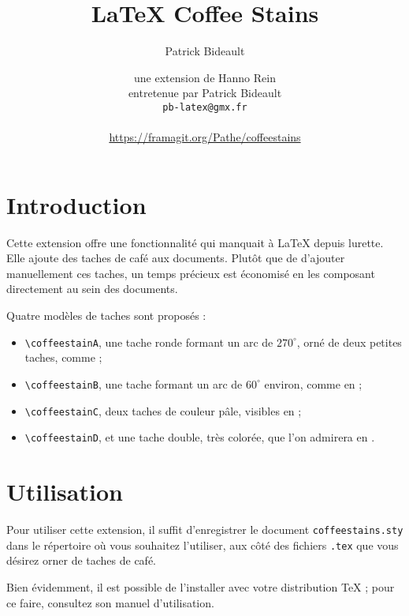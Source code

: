 \documentclass[a4paper, 11pt, BCOR = 0 pt, DIV = 13, oneside]{scrartcl}
\author{Patrick Bideault}
\begin{document}
\title{LaTeX Coffee Stains}
\author{une extension de Hanno Rein\\
  entretenue par Patrick Bideault\\
  \texttt{pb-latex@gmx.fr}\\
  ~\\
  \url{https://framagit.org/Pathe/coffeestains}}
\renewcommand{\today}{version \gitRel{} -- \DTMtoday{}}
\maketitle

\label{stainA}
\section{Introduction}
Cette extension offre une fonctionnalité qui manquait à \LaTeX{} depuis
lurette. Elle ajoute des taches de café aux documents. Plutôt que de
d'ajouter manuellement ces taches, un temps précieux est
économisé en les composant directement au sein des documents.

Quatre modèles de taches sont proposés :

\begin{itemize}
\item \verb|\coffeestainA|, une tache ronde formant un arc de $270^\circ$, orné de deux petites
  taches, comme  ;
\item \verb|\coffeestainB|, une tache formant un arc de $60^\circ$ environ, comme en
     ;
\item \verb|\coffeestainC|, deux taches de couleur pâle, visibles en  ;
\item \verb|\coffeestainD|, et une tache double, très colorée, que l'on admirera en .
\end{itemize}

\section{Utilisation}
Pour utiliser cette extension, il suffit d'enregistrer le document
\texttt{coffeestains.sty} dans le répertoire où vous souhaitez l'utiliser, aux
côté des fichiers \texttt{.tex} que vous désirez orner de taches de café.

Bien évidemment, il est possible de l'installer avec votre distribution \TeX{} ;
pour ce faire, consultez son manuel d'utilisation.
\end{document}
